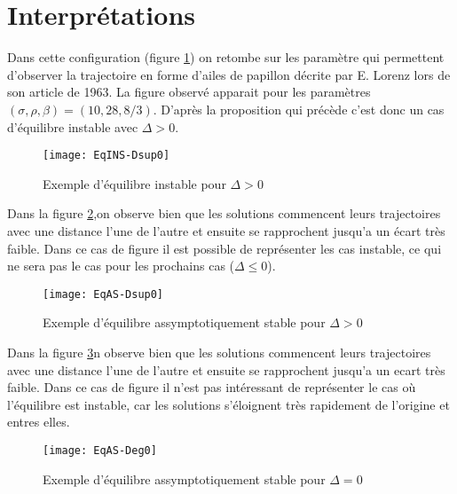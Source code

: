 \documentclass{article}
\newtheorem[M , nocut]{prop}{Proposition}[section]
\newtheorem[S , nocut]{definition}{Définition}
\newtheorem[S , nocut]{lemme}{Lemme}
\newtheorem[L , nocut]{thm}{Théoreme}
\newtheorem[L , nocut]{cor}{Corollaire}
\begin{document}
\newpage
\section{Interprétations}
\begin{example}[Exemple]
    Dans cette configuration (figure \ref{fig:EqINS-Dsup0}) on retombe sur les paramètre qui permettent d'observer la trajectoire en forme d'ailes de papillon décrite par E. Lorenz lors de son article de 1963\cite{lorenz_deterministic_1963}. La figure observé apparait pour les paramètres $(\sigma,\rho,\beta) = (10,28,8/3)$. D'après la proposition qui précède c'est donc un cas d'équilibre instable avec $\Delta>0$.

    \begin{figure}[!ht]
        \centering
        \texttt{[image: EqINS-Dsup0]}
        \caption{Exemple d'équilibre instable pour $\Delta>0$}
        \label{fig:EqINS-Dsup0}
    \end{figure}

    Dans la figure \ref{fig:EqAS-Dsup0},on observe bien que les solutions commencent leurs trajectoires avec une distance l'une de l'autre et ensuite se rapprochent jusqu'a un écart très faible. Dans ce cas de figure il est possible de représenter les cas instable, ce qui ne sera pas le cas pour les prochains cas ($\Delta \le 0$).
    
    \begin{figure}[!ht]
        \centering
        \texttt{[image: EqAS-Dsup0]}
        \caption{Exemple d'équilibre assymptotiquement stable pour $\Delta>0$}
        \label{fig:EqAS-Dsup0}
    \end{figure}
    
\end{example}
\begin{example}[Exemple]
    Dans la figure \ref{fig:EqAS-Deg0}n observe bien que les solutions commencent leurs trajectoires avec une distance l'une de l'autre et ensuite se rapprochent jusqu'a un ecart très faible. Dans ce cas de figure il n'est pas intéressant de représenter le cas où l'équilibre est instable, car les solutions s'éloignent très rapidement de l'origine et entres elles.
    \begin{figure}[ht]
        \label{fig:EqAS-Deg0}
        \centering
        \texttt{[image: EqAS-Deg0]}
        \caption{Exemple d'équilibre assymptotiquement stable pour $\Delta=0$}
    \end{figure}
\end{example}
\end{document}
